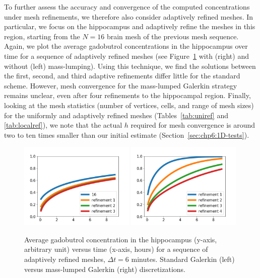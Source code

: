 To further assess the accuracy and convergence of the computed
concentrations under mesh refinements, we therefore also consider
adaptively refined meshes. In particular, we focus on the hippocampus
and adaptively refine the meshes in this region, starting from the
$N=16$ brain mesh of the previous mesh sequence. Again, we plot the
average gadobutrol concentrations in the hippocampus over time for
a sequence of adaptively refined meshes (see
Figure~\ref{fig:chp6:numerics3} with (right) and without (left)
mass-lumping). Using this technique, we find the solutions between the first, second,
and third adaptive refinements differ little for the standard
scheme. However, mesh convergence for the mass-lumped Galerkin
strategy remains unclear, even after four refinements to the
hippocampal region. Finally, looking at the mesh statistics (number of
vertices, cells, and range of mesh sizes) for the uniformly and
adaptively refined meshes (Tables~\ref{tab:uniref} and
\ref{tab:localref}), we note that the actual $h$ required for mesh
convergence is around two to ten times smaller than our initial estimate
(Section~\ref{sec:chp6:1D-tests}).
\begin{figure}	
\includegraphics[width=0.49\textwidth]{./graphics/chp6/tracer_hippocampus_notlumped_addaptive.png}
\includegraphics[width=0.49\textwidth]{./graphics/chp6/tracer_hippocampus_lumped_addaptive.png}
  \caption{Average gadobutrol concentration in the hippocampus
    (y-axis, arbitrary unit) versus time (x-axis, hours) for a
    sequence of adaptively refined meshes, $\Delta t = 6$
    minutes. Standard Galerkin (left) versus mass-lumped Galerkin (right)
    discretizations.}
\label{fig:chp6:numerics3}
\end{figure}
